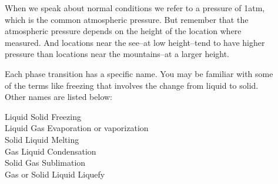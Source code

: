 \documentclass[main.tex]{subfiles}
\newcommand\chapterlabel{solids}
\begin{document}
\begin{description}
\item[] When we speak about normal conditions we refer to a pressure of 1atm, which is the common atmospheric pressure. But remember that the atmospheric pressure depends on the height of the location where measured. And locations near the see--at low height--tend to have higher pressure than locations near the mountains--at a larger height.
\item[]
Each phase transition has a specific name. You may be familiar with some of the terms like freezing that involves the change from liquid to solid. Other names are listed below:
\begin{center}Liquid \ce{->} Solid \hspace*{0pt}\hfill Freezing\\
Liquid\ce{->} Gas \hspace*{0pt}\hfill Evaporation or vaporization\\
Solid\ce{->} Liquid \hspace*{0pt}\hfill Melting\\
Gas \ce{->} Liquid \hspace*{0pt}\hfill Condensation\\
Solid \ce{->} Gas \hspace*{0pt}\hfill Sublimation\\
Gas or Solid \ce{->} Liquid \hspace*{0pt}\hfill Liquefy 

\end{center}
     \label{Fig:{\chapterlabel}\thefigurenewcounter}
     \begin{center}
\end{center}
\end{description}
\end{document}
